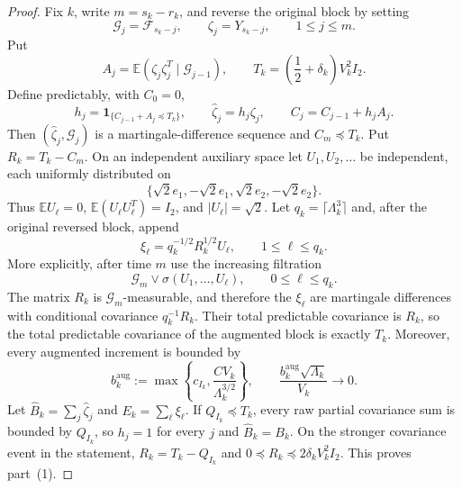 \documentclass[10pt,a4paper]{amsart}
\newcommand{\E}{\mathbb E}
\begin{document}
\begin{proof}
Fix $k$, write $m=s_k-r_k$, and reverse the original block by setting
\[
 \mathcal G_j=\mathcal F_{s_k-j},
 \qquad \zeta_j=Y_{s_k-j},
 \qquad 1\le j\le m.
\]
Put
\[
 A_j=\E(\zeta_j\zeta_j^T\mid\mathcal G_{j-1}),
 \qquad
 T_k=\left(\frac12+\delta_k\right)V_k^2I_2.
\]
Define predictably, with $C_0=0$,
\[
 h_j=\mathbf1_{\{C_{j-1}+A_j\preceq T_k\}},
 \qquad
 \widehat\zeta_j=h_j\zeta_j,
 \qquad
 C_j=C_{j-1}+h_jA_j.
\]
Then $(\widehat\zeta_j,\mathcal G_j)$ is a martingale-difference sequence and
$C_m\preceq T_k$. Put $R_k=T_k-C_m$. On an independent auxiliary space let
$U_1,U_2,\ldots$ be independent, each uniformly distributed on
\[
 \{\sqrt2e_1,-\sqrt2e_1,\sqrt2e_2,-\sqrt2e_2\}.
\]
Thus $\E U_\ell=0$, $\E(U_\ell U_\ell^T)=I_2$, and $|U_\ell|=\sqrt2$.
Let $q_k=\lceil\Lambda_k^3\rceil$ and, after the original reversed block,
append
\[
 \xi_\ell=q_k^{-1/2}R_k^{1/2}U_\ell,
 \qquad 1\le\ell\le q_k.
\]
More explicitly, after time $m$ use the increasing filtration
\[
 \mathcal G_m\vee\sigma(U_1,\ldots,U_\ell),
 \qquad 0\le\ell\le q_k.
\]
The matrix $R_k$ is $\mathcal G_m$-measurable, and therefore the $\xi_\ell$
are martingale differences with conditional covariance $q_k^{-1}R_k$.
Their total predictable covariance is $R_k$, so the total predictable
covariance of the augmented block is exactly $T_k$. Moreover, every augmented
increment is bounded by
\begin{equation}\label{eq:augmented-increment-bound}
 b_k^{\mathrm{aug}}:=\max\left\{c_{I_k},\frac{CV_k}{\Lambda_k^{3/2}}\right\},
 \qquad
 \frac{b_k^{\mathrm{aug}}\sqrt{\Lambda_k}}{V_k}\to0.
\end{equation}
Let $\widehat B_k=\sum_j\widehat\zeta_j$ and
$E_k=\sum_\ell\xi_\ell$. If $Q_{I_k}\preceq T_k$, every raw partial
covariance sum is bounded by $Q_{I_k}$, so $h_j=1$ for every $j$ and
$\widehat B_k=B_k$. On the stronger covariance event in the statement,
$R_k=T_k-Q_{I_k}$ and $0\preceq R_k\preceq2\delta_kV_k^2I_2$. This proves
part~(1).


\end{proof}
\end{document}
